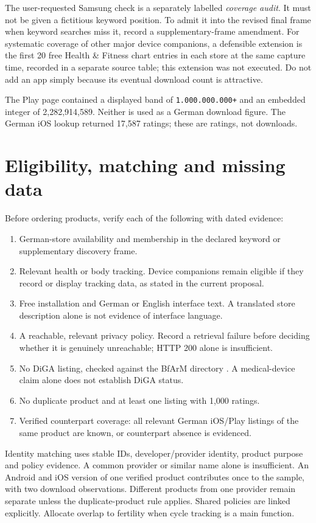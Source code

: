 \documentclass[10pt,a4paper]{article}
\begin{document}
The user-requested Samsung check is a separately labelled \emph{coverage audit}.
It must not be given a fictitious keyword position. To admit it into the revised
final frame when keyword searches miss it, record a supplementary-frame amendment.
For systematic coverage of other major device companions, a defensible extension
is the first 20 free Health \& Fitness chart entries in each store at the same
capture time, recorded in a separate source table; this extension was not executed.
Do not add an app simply because its eventual download count is attractive.

The Play page contained a displayed band of \texttt{1.000.000.000+} and an embedded
integer of 2,282,914,589. Neither is used as a German download figure.
The German iOS lookup returned 17,587 ratings; these are ratings, not downloads.

\section{Eligibility, matching and missing data}
Before ordering products, verify each of the following with dated evidence:
\begin{enumerate}
\item German-store availability and membership in the declared keyword or
supplementary discovery frame.
\item Relevant health or body tracking. Device companions remain eligible if
they record or display tracking data, as stated in the current proposal.
\item Free installation and German or English interface text. A translated store
description alone is not evidence of interface language.
\item A reachable, relevant privacy policy. Record a retrieval failure before
deciding whether it is genuinely unreachable; HTTP 200 alone is insufficient.
\item No DiGA listing, checked against the BfArM directory \cite{diga}.
A medical-device claim alone does not establish DiGA status.
\item No duplicate product and at least one listing with 1,000 ratings.
\item Verified counterpart coverage: all relevant German iOS/Play listings of
the same product are known, or counterpart absence is evidenced.
\end{enumerate}
Identity matching uses stable IDs, developer/provider identity, product purpose
and policy evidence. A common provider or similar name alone is insufficient.
An Android and iOS version of one verified product contributes once to the sample,
with two download observations. Different products from one provider remain
separate unless the duplicate-product rule applies. Shared policies are linked
explicitly. Allocate overlap to fertility when cycle tracking is a main function.
\end{document}
